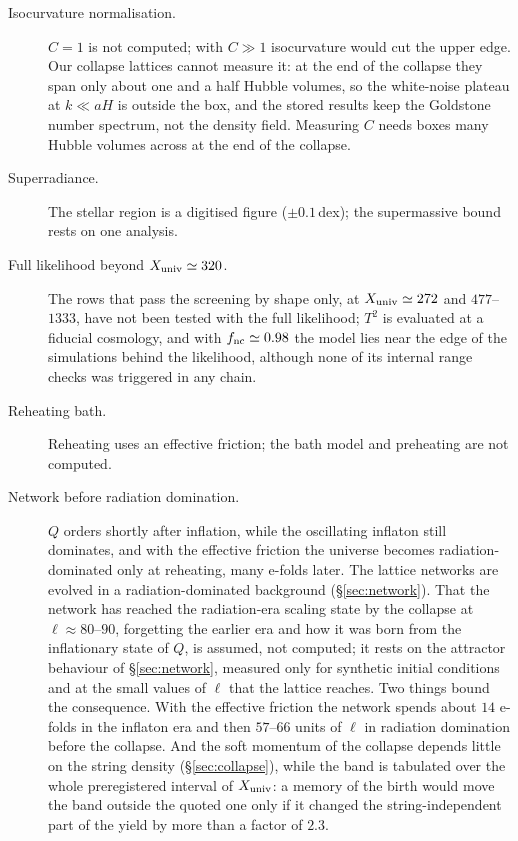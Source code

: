 \documentclass[11pt,a4paper]{article}
\newcommand{\Xu}{X_{\rm univ}}
\begin{document}
\begin{description}
\item[Isocurvature normalisation.] $C=1$ is not computed; with $C\gg1$ isocurvature would cut the upper edge. Our collapse lattices cannot measure it: at the end of the collapse they span only about one and a half Hubble volumes, so the white-noise plateau at $k\ll aH$ is outside the box, and the stored results keep the Goldstone number spectrum, not the density field. Measuring $C$ needs boxes many Hubble volumes across at the end of the collapse.
\item[Superradiance.] The stellar region is a digitised figure ($\pm0.1$\,dex); the supermassive bound rests on one analysis.
\item[Full likelihood beyond $\Xu\simeq320$.] The rows that pass the screening by shape only, at $\Xu\simeq272$ and $477$--$1333$, have not been tested with the full likelihood; $T^2$ is evaluated at a fiducial cosmology, and with $f_{\rm nc}\simeq0.98$ the model lies near the edge of the simulations behind the likelihood, although none of its internal range checks was triggered in any chain.
\item[Reheating bath.] Reheating uses an effective friction; the bath model and preheating are not computed.
\item[Network before radiation domination.] $Q$ orders shortly after inflation, while the oscillating inflaton still dominates, and with the effective friction the universe becomes radiation-dominated only at reheating, many e-folds later. The lattice networks are evolved in a radiation-dominated background (\S\ref{sec:network}). That the network has reached the radiation-era scaling state by the collapse at $\ell\approx80$--$90$, forgetting the earlier era and how it was born from the inflationary state of $Q$, is assumed, not computed; it rests on the attractor behaviour of \S\ref{sec:network}, measured only for synthetic initial conditions and at the small values of $\ell$ that the lattice reaches. Two things bound the consequence. With the effective friction the network spends about $14$ e-folds in the inflaton era and then $57$--$66$ units of $\ell$ in radiation domination before the collapse. And the soft momentum of the collapse depends little on the string density (\S\ref{sec:collapse}), while the band is tabulated over the whole preregistered interval of $\Xu$: a memory of the birth would move the band outside the quoted one only if it changed the string-independent part of the yield by more than a factor of $2.3$.
\end{description}
\end{document}

